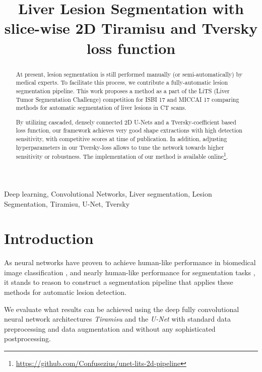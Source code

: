 \documentclass{article}
\title{Liver Lesion Segmentation with slice-wise 2D Tiramisu and Tversky loss function}
\begin{document}
\maketitle
\begin{abstract}




At present, lesion segmentation is still performed manually (or semi-automatically) by medical experts. To facilitate this process, we contribute a fully-automatic lesion segmentation pipeline.
This work proposes a method as a part of the LiTS (Liver Tumor Segmentation Challenge) competition for ISBI 17 and MICCAI 17 comparing methods for automatic segmentation of liver lesions in CT scans. 

By utilizing cascaded, densely connected 2D U-Nets and a Tversky-coefficient based loss function, our framework achieves very good shape extractions with high detection sensitivity, with competitive scores at time of publication.
In addition, adjusting hyperparameters in our Tversky-loss allows to tune the network towards higher sensitivity or robustness.
The implementation of our method is available  online\footnote{\url{https://github.com/Confusezius/unet-lits-2d-pipeline}}.


\end{abstract}
\begin{keywords}
Deep learning, Convolutional Networks, Liver segmentation, Lesion Segmentation, Tiramisu, U-Net, Tversky
\end{keywords}
\section{Introduction}
\label{sec:intro}

As neural networks have proven to achieve human-like performance in biomedical image classification \cite{DERM}, and nearly human-like performance for segmentation tasks \cite{SEG}, it stands to reason to construct a segmentation pipeline that applies these methods for automatic lesion detection.

We evaluate what results can be achieved using the deep fully convolutional neural network architectures \textit{Tiramisu} \cite{tiramisu} and the \textit{U-Net} \cite{UNET} with standard data preprocessing and data augmentation and without any sophisticated postprocessing. 
\end{document}
